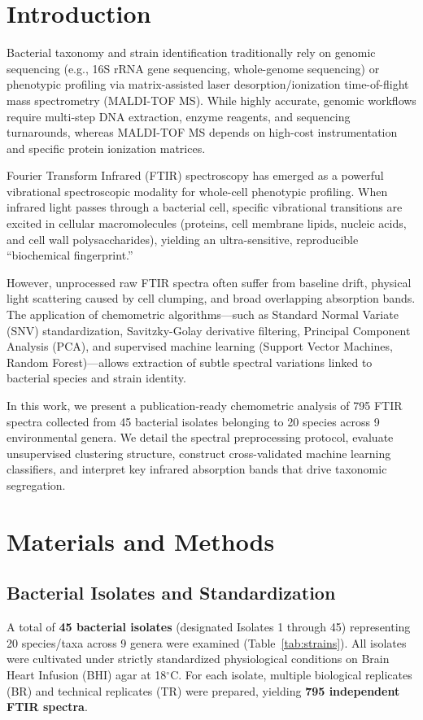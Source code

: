 \documentclass[11pt,a4paper]{article}
\begin{document}
\hr

\section{Introduction}
Bacterial taxonomy and strain identification traditionally rely on genomic sequencing (e.g., 16S rRNA gene sequencing, whole-genome sequencing) or phenotypic profiling via matrix-assisted laser desorption/ionization time-of-flight mass spectrometry (MALDI-TOF MS). While highly accurate, genomic workflows require multi-step DNA extraction, enzyme reagents, and sequencing turnarounds, whereas MALDI-TOF MS depends on high-cost instrumentation and specific protein ionization matrices.

Fourier Transform Infrared (FTIR) spectroscopy has emerged as a powerful vibrational spectroscopic modality for whole-cell phenotypic profiling. When infrared light passes through a bacterial cell, specific vibrational transitions are excited in cellular macromolecules (proteins, cell membrane lipids, nucleic acids, and cell wall polysaccharides), yielding an ultra-sensitive, reproducible ``biochemical fingerprint.''

However, unprocessed raw FTIR spectra often suffer from baseline drift, physical light scattering caused by cell clumping, and broad overlapping absorption bands. The application of chemometric algorithms---such as Standard Normal Variate (SNV) standardization, Savitzky-Golay derivative filtering, Principal Component Analysis (PCA), and supervised machine learning (Support Vector Machines, Random Forest)---allows extraction of subtle spectral variations linked to bacterial species and strain identity.

In this work, we present a publication-ready chemometric analysis of 795 FTIR spectra collected from 45 bacterial isolates belonging to 20 species across 9 environmental genera. We detail the spectral preprocessing protocol, evaluate unsupervised clustering structure, construct cross-validated machine learning classifiers, and interpret key infrared absorption bands that drive taxonomic segregation.

\section{Materials and Methods}

\subsection{Bacterial Isolates and Standardization}
A total of \textbf{45 bacterial isolates} (designated Isolates 1 through 45) representing 20 species/taxa across 9 genera were examined (Table~\ref{tab:strains}). All isolates were cultivated under strictly standardized physiological conditions on Brain Heart Infusion (BHI) agar at 18$^\circ$C. For each isolate, multiple biological replicates (BR) and technical replicates (TR) were prepared, yielding \textbf{795 independent FTIR spectra}.
\end{document}
